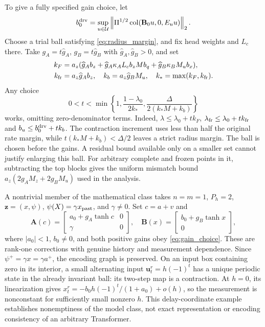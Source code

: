 \documentclass[journal]{IEEEtran}
\newcommand{\vu}{\mathbf{u}}
\newcommand{\vz}{\mathbf{z}}
\newcommand{\mA}{\mathbf{A}}
\newcommand{\mB}{\mathbf{B}}
\newcommand{\norm}[1]{\left\lVert #1\right\rVert}
\newcommand{\col}{\operatorname{col}}
\begin{document}
To give a fully specified gain choice, let
\begin{equation*}
b_0^{\rm drv}=\sup_{u\in\mathcal U}
\norm{\Pi^{1/2}\col(\mB_0u,0,E_uu)}_2.
\end{equation*}
Choose a trial ball satisfying \eqref{eq:radius_margin}, and fix head weights and $L_c$ there. Take $g_A=t\widehat g_A$, $g_B=t\widehat g_B$ with $\widehat g_A,\widehat g_B>0$, and set
\begin{equation}
\begin{split}
k_F&=a_z(\widehat g_A b_z+\widehat g_A\kappa_A L_c b_zMb_q
+\widehat g_B\kappa_BM_ub_x),\\
k_{\rm fr}&=a_z\widehat g_A b_z,\quad k_b=a_z\widehat g_BM_u,
\quad k_* =\max(k_F,k_{\rm fr}).
\end{split}
\label{eq:gain_coefficients}
\end{equation}
Any choice
\begin{equation}
0<t<\min\left\{1,\frac{1-\lambda_0}{2k_*},
\frac{\Delta}{2(k_*M+k_b)}\right\}
\label{eq:gain_choice}
\end{equation}
works, omitting zero-denominator terms. Indeed, $\lambda\le\lambda_0+tk_F$, $\lambda_{\rm fr}\le\lambda_0+tk_{\rm fr}$ and $b_u\le b_0^{\rm drv}+tk_b$. The contraction increment uses less than half the original rate margin, while $t(k_*M+k_b)<\Delta/2$ leaves a strict radius margin. The ball is chosen before the gains. A residual bound available only on a smaller set cannot justify enlarging this ball. For arbitrary complete and frozen points in it, subtracting the top blocks gives the uniform mismatch bound $a_z(2g_AM_z+2g_BM_u)$ used in the analysis.

A nontrivial member of the mathematical class takes $n=m=1$, $P_h=2$, $\vz=(x,\psi)$, $\psi(X)=\gamma x_{\rm past}$, and $\gamma\ne0$. Set $c=a+v$ and
\begin{equation}
\mA(c)=\begin{bmatrix}a_0+g_A\tanh c&0\\\gamma&0\end{bmatrix},\quad
\mB(x)=\begin{bmatrix}b_0+g_B\tanh x\\0\end{bmatrix},
\label{eq:analytic_example}
\end{equation}
where $|a_0|<1$, $b_0\ne0$, and both positive gains obey \eqref{eq:gain_choice}. These are rank-one corrections with genuine history and measurement dependence. Since $\psi^+=\gamma x=\gamma a^+$, the encoding graph is preserved. On an input box containing zero in its interior, a small alternating input $\vu_t^r=h(-1)^t$ has a unique periodic state in the already invariant ball: its two-step map is a contraction. At $h=0$, its linearization gives $x_t^r=-b_0h(-1)^t/(1+a_0)+o(h)$, so the measurement is nonconstant for sufficiently small nonzero $h$. This delay-coordinate example establishes nonemptiness of the model class, not exact representation or encoding consistency of an arbitrary Transformer.
\end{document}
